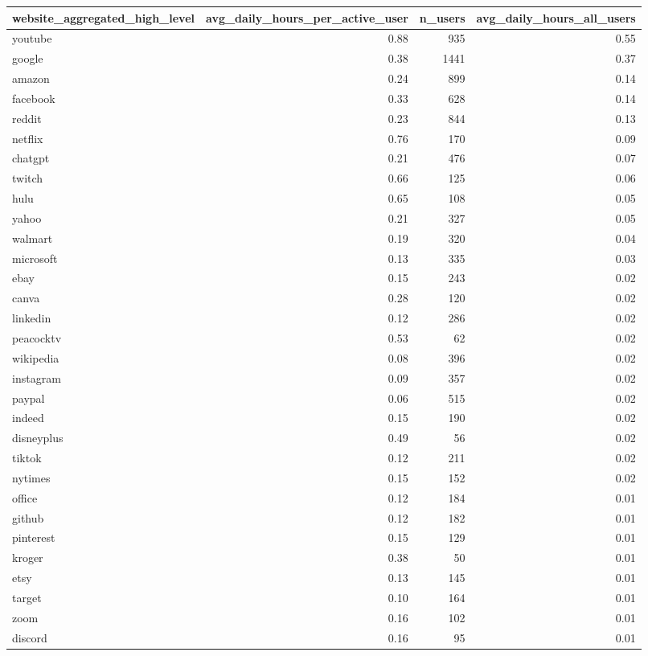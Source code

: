\begin{table}[ht]
\centering
\begin{tabular}{lrrr}
  \hline
website_aggregated_high_level & avg_daily_hours_per_active_user & n_users & avg_daily_hours_all_users \\ 
  \hline
youtube & 0.88 & 935 & 0.55 \\ 
  google & 0.38 & 1441 & 0.37 \\ 
  amazon & 0.24 & 899 & 0.14 \\ 
  facebook & 0.33 & 628 & 0.14 \\ 
  reddit & 0.23 & 844 & 0.13 \\ 
  netflix & 0.76 & 170 & 0.09 \\ 
  chatgpt & 0.21 & 476 & 0.07 \\ 
  twitch & 0.66 & 125 & 0.06 \\ 
  hulu & 0.65 & 108 & 0.05 \\ 
  yahoo & 0.21 & 327 & 0.05 \\ 
  walmart & 0.19 & 320 & 0.04 \\ 
  microsoft & 0.13 & 335 & 0.03 \\ 
  ebay & 0.15 & 243 & 0.02 \\ 
  canva & 0.28 & 120 & 0.02 \\ 
  linkedin & 0.12 & 286 & 0.02 \\ 
  peacocktv & 0.53 &  62 & 0.02 \\ 
  wikipedia & 0.08 & 396 & 0.02 \\ 
  instagram & 0.09 & 357 & 0.02 \\ 
  paypal & 0.06 & 515 & 0.02 \\ 
  indeed & 0.15 & 190 & 0.02 \\ 
  disneyplus & 0.49 &  56 & 0.02 \\ 
  tiktok & 0.12 & 211 & 0.02 \\ 
  nytimes & 0.15 & 152 & 0.02 \\ 
  office & 0.12 & 184 & 0.01 \\ 
  github & 0.12 & 182 & 0.01 \\ 
  pinterest & 0.15 & 129 & 0.01 \\ 
  kroger & 0.38 &  50 & 0.01 \\ 
  etsy & 0.13 & 145 & 0.01 \\ 
  target & 0.10 & 164 & 0.01 \\ 
  zoom & 0.16 & 102 & 0.01 \\ 
  discord & 0.16 &  95 & 0.01 \\ 

\end{tabular}
\end{table}
